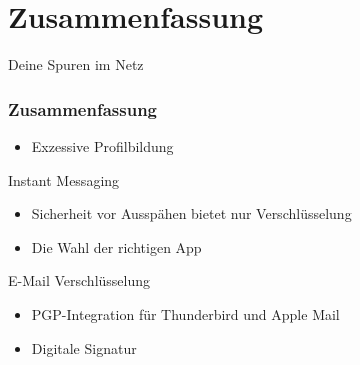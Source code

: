 \section{Zusammenfassung}


\begin{frame}
  Deine Spuren im Netz
  \frametitle{Zusammenfassung}
  \begin{itemize}
   \item Exzessive Profilbildung
  \end{itemize}
  
  Instant Messaging
  \begin{itemize}
   \item Sicherheit vor Ausspähen bietet nur Verschlüsselung
   \item Die Wahl der richtigen App
  \end{itemize}

  E-Mail Verschlüsselung
  \begin{itemize}
   \item PGP-Integration für Thunderbird und Apple Mail
   \item Digitale Signatur
  \end{itemize}
  
\end{frame}